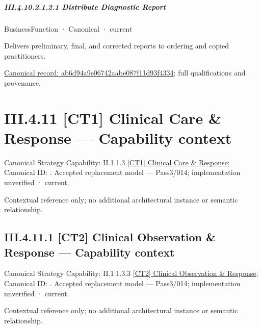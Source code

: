 \subparagraph*{III.4.10.2.1.2.1 Distribute Diagnostic Report}
\label{navigation:III.4.10.2.1.2.1}

\label{element:ab6d94a9e06742aabe087f11d93f4334}
{\small BusinessFunction · Canonical · current}\par

Delivers preliminary, final, and corrected reports to ordering and copied practitioners.


{\footnotesize \href{../../../../continuum/business/business-function/ab6d94a9e06742aabe087f11d93f4334.md}{Canonical record: ab6d94a9e06742aabe087f11d93f4334}; full qualifications and provenance.}\par
\section*{III.4.11 [CT1] Clinical Care \& Response — Capability context}
\label{navigation:III.4.11}

{\small Canonical Strategy Capability: II.1.1.3 \hyperref[element:0962afc8439c4e1898a7e2ae3f4186a4]{[CT1] Clinical Care \& Response}; Canonical ID: \texttt{}. Accepted replacement model — Pass3/014; implementation unverified · current.}\par
Contextual reference only; no additional architectural instance or semantic relationship.\par
\subsection*{III.4.11.1 [CT2] Clinical Observation \& Response — Capability context}
\label{navigation:III.4.11.1}

{\small Canonical Strategy Capability: II.1.1.3.3 \hyperref[element:b6794d4b6ac84b9d82613c41ad4650a2]{[CT2] Clinical Observation \& Response}; Canonical ID: \texttt{}. Accepted replacement model — Pass3/014; implementation unverified · current.}\par
Contextual reference only; no additional architectural instance or semantic relationship.\par
